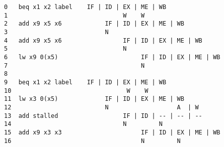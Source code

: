 \documentclass[varwidth, convert]{standalone}
\begin{document}
  \begin{BVerbatim}[]
0   beq x1 x2 label    IF | ID | EX | ME | WB
1                                W    W
2   add x9 x5 x6            IF | ID | EX | ME | WB
3                           N
4   add x9 x5 x6                 IF | ID | EX | ME | WB
5                                N
6   lw x9 0(x5)                       IF | ID | EX | ME | WB
7                                     N
8
9   beq x1 x2 label    IF | ID | EX | ME | WB
10                                W    W
11  lw x3 0(x5)             IF | ID | EX | ME | WB
12                          N                   A  | W
13  add stalled                  IF | ID | -- | -- | --
14                               N         N
15  add x9 x3 x3                      IF | ID | EX | ME | WB
16                                    N         N
  \end{BVerbatim}
\end{document}

